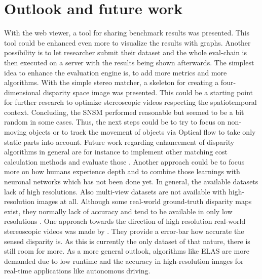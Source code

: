 \section{Outlook and future work}

With the web viewer, a tool for sharing benchmark results was presented.
This tool could be enhanced even more to visualize the results with graphs.
Another possibility is to let researcher submit their dataset and the whole eval-chain is then executed on a server with the results being shown afterwards.
The simplest idea to enhance the evaluation engine is, to add more metrics and more algorithms.
\newline\newline\noindent With the simple stereo matcher, a skeleton for creating a four-dimensional disparity space image was presented.
This could be a starting point for further research to optimize stereoscopic videos respecting the spatiotemporal context.
Concluding, the SNSM performed reasonable but seemed to be a bit random in some cases.
Thus, the next steps could be to try to focus on non-moving objects or to track the movement of objects via Optical flow to take only static parts into account.
\newline\newline\noindent Future work regarding enhancement of disparity algorithms in general are for instance to implement other matching cost calculation methods and evaluate those \citep{hermann2010gradient}.
Another approach could be to focus more on how humans experience depth \citep{deangelis1995neuronal} and to combine those learnings with neuronal networks \citep{olshausen1996emergence} which has not been done yet.
\newline\newline\noindent In general, the available datasets lack of high resolutions.
Also multi-view datasets are not available with high-resolution images at all.
Although some real-world ground-truth disparity maps exist, they normally lack of accuracy and tend to be available in only low resolutions \citep{Geiger2011IV}.
One approach towards the direction of high resolution real-world stereoscopic videos was made by \citeauthor{kondermann2015stereo} \citep{kondermann2015stereo}.
They provide a error-bar how accurate the sensed disparity is.
As this is currently the only dataset of that nature, there is still room for more.
\newline\newline\noindent As a more general outlook, algorithms like ELAS \citep{Geiger2010ACCV} are more demanded due to low runtime and the accuracy in high-resolution images for real-time applications like autonomous driving.
